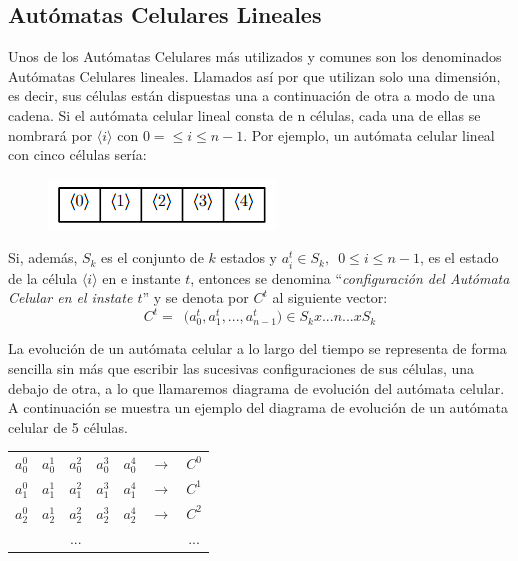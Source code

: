 \subsection{Autómatas Celulares Lineales}
Unos de los Autómatas Celulares más utilizados y comunes son los denominados Autómatas Celulares lineales. Llamados así por que utilizan solo una dimensión, es decir, sus células están dispuestas una a continuación de otra a modo de una cadena. Si el autómata celular lineal consta de n células, cada una de ellas se nombrará por $\langle i \rangle$ con $ 0 = \leq i \leq n-1 $. Por ejemplo, un autómata celular lineal con cinco células sería:

\begin{figure}[H]
\centering
\includegraphics[scale=0.7]{imagenes/name_cell.png}
\label{fig:lineal_1}
\end{figure}

Si, además, $S_k$ es el conjunto de $k$ estados y $a_i^t \in S_k, \enspace 0 \leq i \leq n-1$, es el estado de la célula $\langle i \rangle$ en e instante $t$, entonces se denomina ``\textit{configuración del Autómata Celular en el instate $t$}'' y se denota por $C^t$ al siguiente vector:
$$C^t = \enspace \big( a_0^t,a_1^t, ..., a_{n-1}^t \big) \in S_k x ... n ... x S_k$$

La evolución de un autómata celular a lo largo del tiempo se representa de forma sencilla sin más que escribir las sucesivas configuraciones de sus células, una debajo de otra, a lo que llamaremos diagrama de evolución del autómata celular. A continuación se muestra un ejemplo del diagrama de evolución de un autómata celular de 5 células.

\begin{table}[H]
\centering
\begin{tabular}{lllllll}
\cline{1-5}
\multicolumn{1}{|l|}{$a_0^0$} & \multicolumn{1}{l|}{$a_0^1$} & \multicolumn{1}{l|}{$a_0^2$} & \multicolumn{1}{l|}{$a_0^3$} & \multicolumn{1}{l|}{$a_0^4$} & $\rightarrow$ & $C^0$ \\ \cline{1-5}
\multicolumn{1}{|l|}{$a_1^0$} & \multicolumn{1}{l|}{$a_1^1$} & \multicolumn{1}{l|}{$a_1^2$} & \multicolumn{1}{l|}{$a_1^3$} & \multicolumn{1}{l|}{$a_1^4$} & $\rightarrow$ & $C^1$ \\ \cline{1-5}
\multicolumn{1}{|l|}{$a_2^0$} & \multicolumn{1}{l|}{$a_2^1$} & \multicolumn{1}{l|}{$a_2^2$} & \multicolumn{1}{l|}{$a_2^3$} & \multicolumn{1}{l|}{$a_2^4$} & $\rightarrow$ & $C^2$ \\ \cline{1-5}
 &  & \multicolumn{1}{c}{...} &  &  &  & \multicolumn{1}{c}{...}
\end{tabular}
\end{table}

